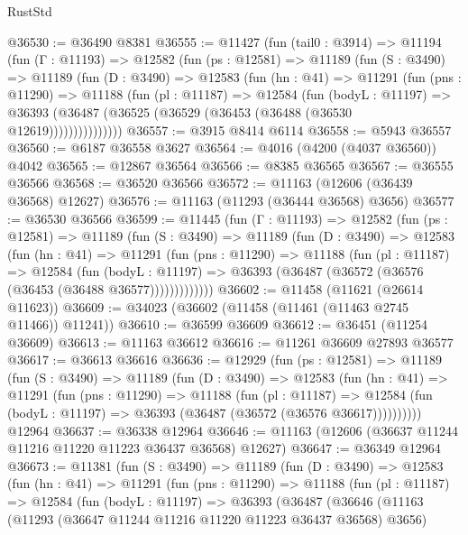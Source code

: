 \begin{lexlean}{RustStd}
\begin{coremodule}
@36530 := @36490 @8381
@36555 := @11427
    (fun (tail0 : @3914) =>
    @11194
      (fun (Γ : @11193) =>
      @12582
        (fun (ps : @12581) =>
        @11189
          (fun (S : @3490) =>
          @11189
            (fun (D : @3490) =>
            @12583
              (fun (hn : @41) =>
              @11291
                (fun (pns : @11290) =>
                @11188
                  (fun (pl : @11187) =>
                  @12584
                    (fun (bodyL : @11197) =>
                    @36393 (@36487 (@36525 (@36529 (@36453 (@36488 (@36530 @12619)))))))))))))))
@36557 := @3915 @8414 @6114
@36558 := @5943 @36557
@36560 := @6187 @36558 @3627
@36564 := @4016 (@4200 (@4037 @36560)) @4042
@36565 := @12867 @36564
@36566 := @8385 @36565
@36567 := @36555 @36566
@36568 := @36520 @36566
@36572 := @11163 (@12606 (@36439 @36568) @12627)
@36576 := @11163 (@11293 (@36444 @36568) @3656)
@36577 := @36530 @36566
@36599 := @11445
    (fun (Γ : @11193) =>
    @12582
      (fun (ps : @12581) =>
      @11189
        (fun (S : @3490) =>
        @11189
          (fun (D : @3490) =>
          @12583
            (fun (hn : @41) =>
            @11291
              (fun (pns : @11290) =>
              @11188
                (fun (pl : @11187) =>
                @12584
                  (fun (bodyL : @11197) =>
                  @36393 (@36487 (@36572 (@36576 (@36453 (@36488 @36577)))))))))))))
@36602 := @11458 (@11621 (@26614 @11623))
@36609 := @34023 (@36602 (@11458 (@11461 (@11463 @2745 @11466)) @11241))
@36610 := @36599 @36609
@36612 := @36451 (@11254 @36609)
@36613 := @11163 @36612
@36616 := @11261 @36609 @27893 @36577
@36617 := @36613 @36616
@36636 := @12929
    (fun (ps : @12581) =>
    @11189
      (fun (S : @3490) =>
      @11189
        (fun (D : @3490) =>
        @12583
          (fun (hn : @41) =>
          @11291
            (fun (pns : @11290) =>
            @11188
              (fun (pl : @11187) =>
              @12584 (fun (bodyL : @11197) => @36393 (@36487 (@36572 (@36576 @36617))))))))))
    @12964
@36637 := @36338 @12964
@36646 := @11163 (@12606 (@36637 @11244 @11216 @11220 @11223 @36437 @36568) @12627)
@36647 := @36349 @12964
@36673 := @11381
    (fun (S : @3490) =>
    @11189
      (fun (D : @3490) =>
      @12583
        (fun (hn : @41) =>
        @11291
          (fun (pns : @11290) =>
          @11188
            (fun (pl : @11187) =>
            @12584
              (fun (bodyL : @11197) =>
              @36393
                (@36487
                  (@36646
                    (@11163
                      (@11293 (@36647 @11244 @11216 @11220 @11223 @36437 @36568) @3656)

\end{coremodule}
\end{lexlean}
